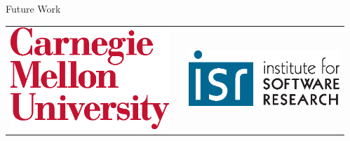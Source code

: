 \documentclass[final,20pt]{beamer}
\newlength{\sepwid}
\newlength{\twocolwid}
\newlength{\specialB}
\begin{document}
\begin{frame}[t]
\begin{columns}[t]
\begin{column}{\twocolwid}
\begin{columns}[t,totalwidth=\twocolwid]
\begin{column}{\specialB}
\begin{block}{\Large Future Work}
\end{block}
\begin{center}
    \begin{tabular}{ccc}
     \includegraphics[width=0.28\linewidth]{CMUlogo.eps} & \hfill & \includegraphics[width=0.50\linewidth]{isr-logo.eps}
    \end{tabular}
\end{center}
\end{column}
\end{columns}

\end{column}

\begin{column}{\sepwid}\end{column}

\end{columns}
\end{frame}
\end{document}
